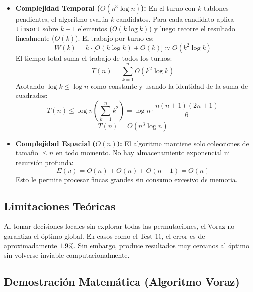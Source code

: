 \documentclass[conference, a4paper]{IEEEtran}
\begin{document}
\begin{itemize}
    \item \textbf{Complejidad Temporal ($O(n^3 \log n)$):} En el turno con $k$ tablones pendientes, el algoritmo evalúa $k$ candidatos. Para cada candidato aplica \texttt{timsort} sobre $k-1$ elementos ($O(k \log k)$) y luego recorre el resultado linealmente ($O(k)$). El trabajo por turno es:
    \begin{equation}
    W(k) = k \cdot \Big[ O(k \log k) + O(k) \Big] \approx O(k^2 \log k)
    \end{equation}
    El tiempo total suma el trabajo de todos los turnos:
    \begin{equation}
    T(n) = \sum_{k=1}^{n} O(k^2 \log k)
    \end{equation}
    Acotando $\log k \leq \log n$ como constante y usando la identidad de la suma de cuadrados:
    \begin{equation}
    T(n) \le \log n \left( \sum_{k=1}^{n} k^2 \right) = \log n \cdot \frac{n(n+1)(2n+1)}{6}
    \end{equation}
    \begin{equation}
    T(n) = O(n^3 \log n)
    \end{equation}

    \item \textbf{Complejidad Espacial ($O(n)$):} El algoritmo mantiene solo colecciones de tamaño $\leq n$ en todo momento. No hay almacenamiento exponencial ni recursión profunda:
    \begin{equation}
    E(n) = O(n) + O(n) + O(n-1) = O(n)
    \end{equation}
    Esto le permite procesar fincas grandes sin consumo excesivo de memoria.
\end{itemize}

\subsection{Limitaciones Teóricas}
Al tomar decisiones locales sin explorar todas las permutaciones, el Voraz no garantiza el óptimo global. En casos como el Test 10, el error es de aproximadamente $1.9\%$. Sin embargo, produce resultados muy cercanos al óptimo sin volverse inviable computacionalmente.

\subsection{Demostración Matemática (Algoritmo Voraz)}
\end{document}
